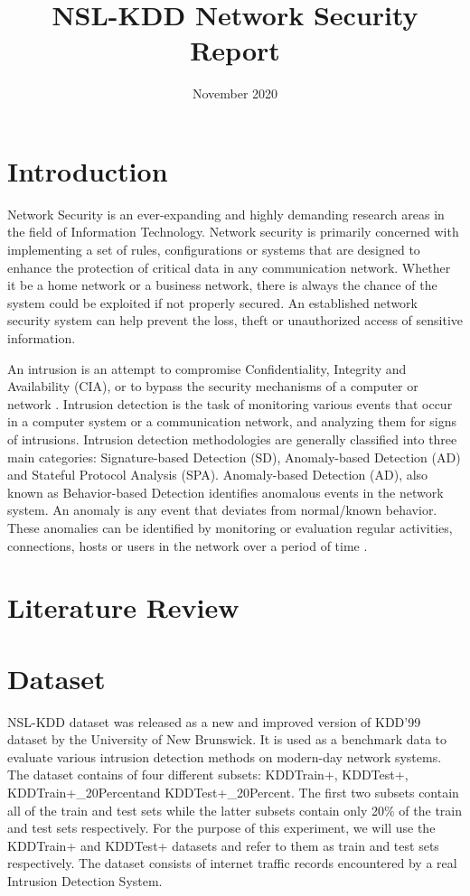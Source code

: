 \documentclass[conference]{IEEEtran}
\title{NSL-KDD Network Security Report}
\author{\IEEEauthorblockN{Rojina Deuja}
\IEEEauthorblockA{\textit{Department of Computer Science and Engineering} \\
\textit{University of Nebraska-Lincoln}\\
Lincoln, United States \\
rojinadeuja33g@gmail.com}}
\date{November 2020}
\begin{document}
\maketitle

\begin{abstract}
\end{abstract}

\begin{IEEEkeywords}
\end{IEEEkeywords}

\section{Introduction}
Network Security is an ever-expanding and highly demanding research areas in the field of Information Technology. Network security is primarily concerned with implementing a set of rules, configurations or systems that are designed to enhance the protection of critical data in any communication network. Whether it be a home network or a business network, there is always the chance of the system could be exploited if not properly secured. An established network security system can help prevent the loss, theft or unauthorized access of sensitive information.

An intrusion is an attempt to compromise Confidentiality, Integrity and Availability (CIA), or to bypass the security mechanisms of a computer or network \cite{b1}. Intrusion detection is the task of monitoring various events that occur in a computer system or a communication network, and analyzing them for signs of intrusions. Intrusion detection methodologies are generally classified into three main categories: Signature-based Detection (SD), Anomaly-based Detection (AD) and Stateful Protocol Analysis (SPA). Anomaly-based Detection (AD), also known as Behavior-based Detection identifies anomalous events in the network system. An anomaly is any event that deviates from normal/known behavior. These anomalies can be identified by monitoring or evaluation regular activities, connections, hosts or users in the network over a period of time \cite{b2}.

\section{Literature Review}
\section{Dataset}
NSL-KDD dataset was released as a new and improved version of KDD'99 dataset by the University of New Brunswick. It is used as a benchmark data to evaluate various intrusion detection methods on modern-day network systems.
The dataset contains of four different subsets: KDDTrain+, KDDTest+, KDDTrain+\_20Percentand KDDTest+\_20Percent. The first two subsets contain all of the train and test sets while the latter subsets contain only 20\% of the train and test sets respectively.
For the purpose of this experiment, we will use the KDDTrain+ and KDDTest+ datasets and refer to them as train and test sets respectively.
The dataset consists of internet traffic records encountered by a real Intrusion Detection System.
\end{document}
